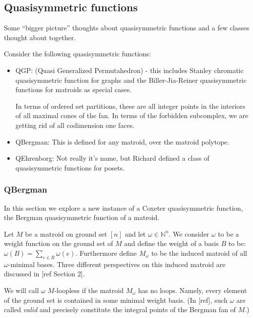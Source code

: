 \documentclass[12pt]{amsart}
\begin{document}
\subsection{Quasisymmetric functions}

Some ``bigger picture'' thoughts about quasisymmetric functions and a few classes thought about together. 

Consider the following quasisymmetric functions:

\begin{itemize}
\item QGP: (Quasi Generalized Permutahedron) - this includes Stanley chromatic quasisymmetric function for graphs and the Biller-Jia-Reiner quasisymmetric functions for matroids as special cases.

In terms of ordered set partitions, these are all integer points in the interiors of all maximal cones of the fan.  In terms of the forbidden subcomplex, we are getting rid of all codimension one faces.  

\item QBergman: This is defined for any matroid, over the matroid polytope.

\item QEhrenborg: Not really it's name, but Richard defined a class of quasisymmetric functions for posets.

\end{itemize}

\subsubsection{QBergman}

In this section we explore a new instance of a Coxeter quasisymmetric
function, the Bergman quasisymmetric function of a matroid.

Let $M$ be a matroid on ground set $[n]$ and let $\omega \in \mathbb{N}^n$.
We consider $\omega$ to be a weight function on the ground set of $M$ and define the weight of a basis $B$ to be: $\omega(B) = \sum_{e\in B} \omega(e)$. 
Furthermore define $M_{\omega}$ to be the induced matroid of all
$\omega$-minimal bases.  Three different perspectives on this induced
matroid are discussed in [ref Section 2].

  We will call $\omega$
$M$-loopless if the matroid $M_{\omega}$ has no loops.  Namely, every
element of the ground set is contained in some minimal weight basis.
(In [ref], such $\omega$ are called {\em valid} and precisely
constitute the integral points of the Bergman fan of $M$.)
\end{document}
